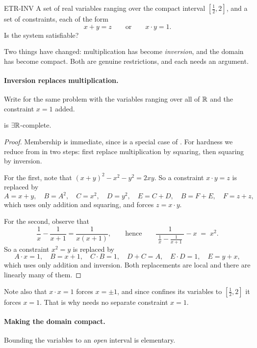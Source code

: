 \begin{probdef}{ETR-INV}
  \instance A set of real variables ranging over the compact interval
  $[\tfrac12, 2]$, and a set of constraints, each of the form
  \[ x + y = z \qquad\text{or}\qquad x \cdot y = 1. \]
  \question Is the system satisfiable?
\end{probdef}

Two things have changed: multiplication has become \emph{inversion}, and the
domain has become compact. Both are genuine restrictions, and each needs an
argument.

\paragraph{Inversion replaces multiplication.}
Write  for the same problem with the variables ranging over all of
$\mathbb{R}$ and the constraint $x = 1$ added.

\begin{lemma}\label{lem:un-inv}
 is $\exists\mathbb{R}$-complete.
\end{lemma}

\begin{proof}
Membership is immediate, since  is a special case of \ETR{}. For
hardness we reduce from  in two steps: first replace multiplication
by squaring, then squaring by inversion.

For the first, note that $(x+y)^2 - x^2 - y^2 = 2xy$. So a constraint
$x \cdot y = z$ is replaced by
\[ A = x+y, \quad B = A^2, \quad C = x^2, \quad D = y^2, \quad
   E = C+D, \quad B = F+E, \quad F = z+z, \]
which uses only addition and squaring, and forces $z = x \cdot y$.

For the second, observe that
\[ \frac{1}{x} - \frac{1}{x+1} = \frac{1}{x(x+1)}, \qquad\text{hence}\qquad
   \frac{1}{\;\frac1x - \frac1{x+1}\;} - x \;=\; x^2 . \]
So a constraint $x^2 = y$ is replaced by
\[ A \cdot x = 1, \quad B = x+1, \quad C \cdot B = 1, \quad D + C = A, \quad
   E \cdot D = 1, \quad E = y + x, \]
which uses only addition and inversion. Both replacements are local and there
are linearly many of them.
\end{proof}

Note also that $x \cdot x = 1$ forces $x = \pm 1$, and since 
confines its variables to $[\tfrac12,2]$ it forces $x = 1$. That is why
 needs no separate constraint $x = 1$.

\paragraph{Making the domain compact.}
Bounding the variables to an \emph{open} interval is elementary.

